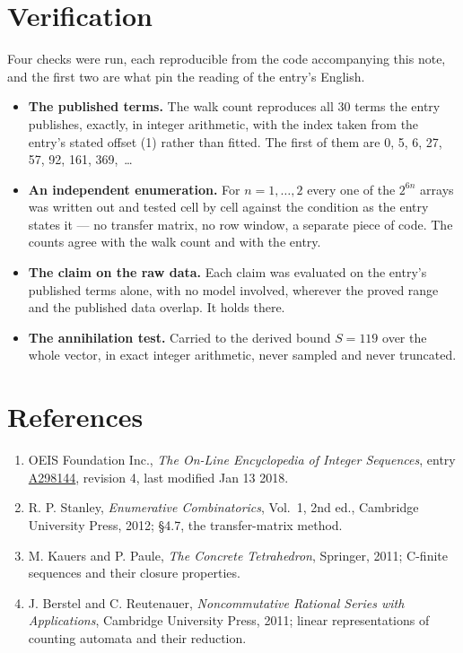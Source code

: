 \documentclass[11pt]{article}
\theoremstyle{definition}
\begin{document}
\section{Verification}

Four checks were run, each reproducible from the code accompanying this note, and the first two are what pin the reading of the entry's English.

\begin{itemize}

\item {\bfseries The published terms.} The walk count reproduces all 30 terms the entry publishes, exactly, in integer arithmetic, with the index taken from the entry's stated offset (1) rather than fitted. The first of them are 0, 5, 6, 27, 57, 92, 161, 369,~\dots

\item {\bfseries An independent enumeration.} For $n = 1,\dots,2$ every one of the $2^{6n}$ arrays was written out and tested cell by cell against the condition as the entry states it --- no transfer matrix, no row window, a separate piece of code. The counts agree with the walk count and with the entry.

\item {\bfseries The claim on the raw data.} Each claim was evaluated on the entry's published terms alone, with no model involved, wherever the proved range and the published data overlap. It holds there.

\item {\bfseries The annihilation test.} Carried to the derived bound $S = 119$ over the whole vector, in exact integer arithmetic, never sampled and never truncated.

\end{itemize}

\section{References}

\begin{enumerate}

\item OEIS Foundation Inc., \emph{The On-Line Encyclopedia of Integer Sequences}, entry \href{https://oeis.org/A298144}{A298144}, revision 4, last modified Jan 13 2018.

\item R. P. Stanley, \emph{Enumerative Combinatorics}, Vol.~1, 2nd ed., Cambridge University Press, 2012; \S4.7, the transfer-matrix method.

\item M. Kauers and P. Paule, \emph{The Concrete Tetrahedron}, Springer, 2011; C-finite sequences and their closure properties.

\item J. Berstel and C. Reutenauer, \emph{Noncommutative Rational Series with Applications}, Cambridge University Press, 2011; linear representations of counting automata and their reduction.

\end{enumerate}
\end{document}
